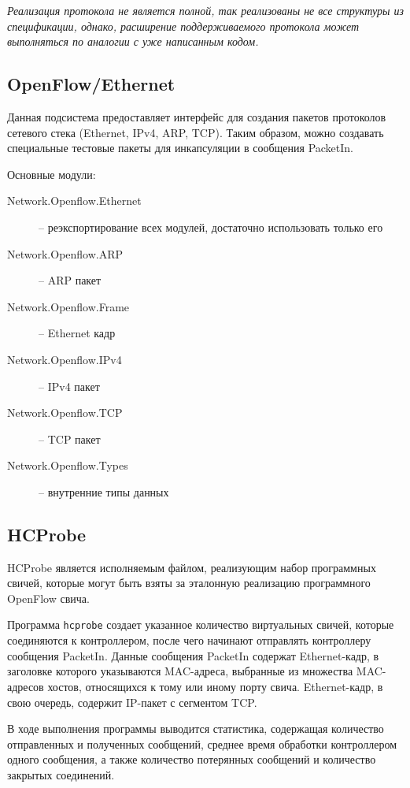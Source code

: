 \documentclass[9pt,a4paper]{article}
\begin{document}
\emph{Реализация протокола не является полной, так реализованы не все структуры из
спецификации, однако, расширение поддерживаемого протокола может выполняться по аналогии с
уже написанным кодом.}

\subsection{OpenFlow/Ethernet}

Данная подсистема предоставляет интерфейс для создания пакетов протоколов сетевого стека (Ethernet, IPv4, ARP, TCP). Таким образом, можно создавать специальные тестовые пакеты для инкапсуляции в сообщения PacketIn.

Основные модули:

\begin{description}
  \item[Network.Openflow.Ethernet] -- реэкспортирование всех модулей, достаточно использовать только его
  \item[Network.Openflow.ARP]      -- ARP пакет
  \item[Network.Openflow.Frame]    -- Ethernet кадр
  \item[Network.Openflow.IPv4]     -- IPv4 пакет
  \item[Network.Openflow.TCP]      -- TCP пакет
  \item[Network.Openflow.Types]    -- внутренние типы данных
\end{description}

\subsection{HCProbe}

HCProbe является исполняемым файлом, реализующим набор программных свичей, которые могут быть взяты за эталонную реализацию программного OpenFlow свича.

Программа \texttt{hcprobe} создает указанное количество виртуальных свичей,
которые соединяются к контроллером, после чего начинают отправлять контроллеру сообщения PacketIn. Данные сообщения PacketIn содержат Ethernet-кадр, в заголовке которого указываются MAC-адреса, выбранные из множества MAC-адресов хостов, относящихся к тому или иному порту свича. Ethernet-кадр, в свою очередь, содержит IP-пакет с сегментом TCP.

В ходе выполнения программы выводится статистика, содержащая количество отправленных и полученных сообщений, среднее время обработки контроллером одного сообщения, а также количество потерянных сообщений и количество закрытых соединений.
\end{document}
